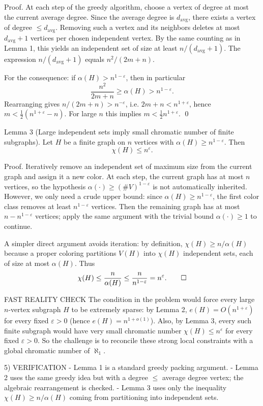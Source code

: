 Proof.
At each step of the greedy algorithm, choose a vertex of degree at most the current average degree.
Since the average degree is $d_{\mathrm{avg}}$, there exists a vertex of degree $\le d_{\mathrm{avg}}$.
Removing such a vertex and its neighbors deletes at most $d_{\mathrm{avg}}+1$ vertices per chosen independent vertex.
By the same counting as in Lemma 1, this yields an independent set of size at least $n/(d_{\mathrm{avg}}+1)$.
The expression $n/(d_{\mathrm{avg}}+1)$ equals $n^2/(2m+n)$.

For the consequence: if $\alpha(H)>n^{1-\varepsilon}$, then in particular
\[\frac{n^2}{2m+n}\ge \alpha(H) > n^{1-\varepsilon}.\]
Rearranging gives $n/(2m+n)>n^{-\varepsilon}$, i.e. $2m+n < n^{1+\varepsilon}$, hence $m<\tfrac12(n^{1+\varepsilon}-n)$.
For large $n$ this implies $m<\tfrac12 n^{1+\varepsilon}$. \qed

Lemma 3 (Large independent sets imply small chromatic number of finite subgraphs).
Let $H$ be a finite graph on $n$ vertices with $\alpha(H)\ge n^{1-\varepsilon}$.
Then
\[\chi(H)\le n^{\varepsilon}.\]

Proof.
Iteratively remove an independent set of maximum size from the current graph and assign it a new color.
At each step, the current graph has at most $n$ vertices, so the hypothesis $\alpha(\cdot)\ge (\#V)^{1-\varepsilon}$ is not automatically inherited.
However, we only need a crude upper bound: since $\alpha(H)\ge n^{1-\varepsilon}$, the first color class removes at least $n^{1-\varepsilon}$ vertices.
Then the remaining graph has at most $n-n^{1-\varepsilon}$ vertices; apply the same argument with the trivial bound $\alpha(\cdot)\ge 1$ to continue.

A simpler direct argument avoids iteration: by definition, $\chi(H)\ge n/\alpha(H)$ because a proper coloring partitions $V(H)$ into $\chi(H)$ independent sets, each of size at most $\alpha(H)$.
Thus
\[\chi(H)\le \frac{n}{\alpha(H)}\le \frac{n}{n^{1-\varepsilon}}=n^{\varepsilon}.\qed\]

FAST REALITY CHECK
The condition in the problem would force every large $n$-vertex subgraph $H$ to be extremely sparse:
by Lemma 2, $e(H)=O(n^{1+\varepsilon})$ for every fixed $\varepsilon>0$ (hence $e(H)=n^{1+o(1)}$).
Also, by Lemma 3, every such finite subgraph would have very small chromatic number $\chi(H)\le n^{\varepsilon}$ for every fixed $\varepsilon>0$.
So the challenge is to reconcile these strong local constraints with a global chromatic number of $\aleph_1$.

5) VERIFICATION
- Lemma 1 is a standard greedy packing argument.
- Lemma 2 uses the same greedy idea but with a degree $\le$ average degree vertex; the algebraic rearrangement is checked.
- Lemma 3 uses only the inequality $\chi(H)\ge n/\alpha(H)$ coming from partitioning into independent sets.


